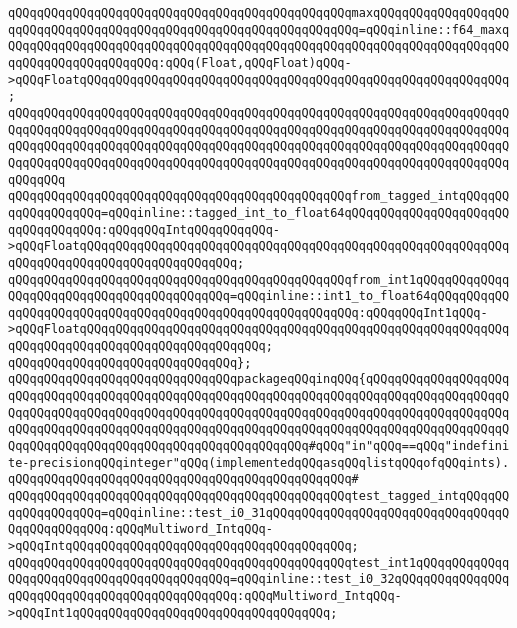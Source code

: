 \verb|qQQqqQQqqQQqqQQqqQQqqQQqqQQqqQQqqQQqqQQqqQQqqQQqmaxqQQqqQQqqQQqqQQqqQQqqQQqqQQqqQQqqQQqqQQqqQQqqQQqqQQqqQQqqQQqqQQqqQQq=qQQqinline::f64_maxqQQqqQQqqQQqqQQqqQQqqQQqqQQqqQQqqQQqqQQqqQQqqQQqqQQqqQQqqQQqqQQqqQQqqQQqqQQqqQQqqQQqqQQqqQQq:qQQq(Float,qQQqFloat)qQQq->qQQqFloatqQQqqQQqqQQqqQQqqQQqqQQqqQQqqQQqqQQqqQQqqQQqqQQqqQQqqQQqqQQq;|\newline
\verb|qQQqqQQqqQQqqQQqqQQqqQQqqQQqqQQqqQQqqQQqqQQqqQQqqQQqqQQqqQQqqQQqqQQqqQQqqQQqqQQqqQQqqQQqqQQqqQQqqQQqqQQqqQQqqQQqqQQqqQQqqQQqqQQqqQQqqQQqqQQqqQQqqQQqqQQqqQQqqQQqqQQqqQQqqQQqqQQqqQQqqQQqqQQqqQQqqQQqqQQqqQQqqQQqqQQqqQQqqQQqqQQqqQQqqQQqqQQqqQQqqQQqqQQqqQQqqQQqqQQqqQQqqQQqqQQqqQQqqQQqqQQqqQQq|\newline
\verb|qQQqqQQqqQQqqQQqqQQqqQQqqQQqqQQqqQQqqQQqqQQqqQQqfrom_tagged_intqQQqqQQqqQQqqQQqqQQq=qQQqinline::tagged_int_to_float64qQQqqQQqqQQqqQQqqQQqqQQqqQQqqQQqqQQq:qQQqqQQqIntqQQqqQQqqQQq->qQQqFloatqQQqqQQqqQQqqQQqqQQqqQQqqQQqqQQqqQQqqQQqqQQqqQQqqQQqqQQqqQQqqQQqqQQqqQQqqQQqqQQqqQQqqQQqqQQq;|\newline
\verb|qQQqqQQqqQQqqQQqqQQqqQQqqQQqqQQqqQQqqQQqqQQqqQQqfrom_int1qQQqqQQqqQQqqQQqqQQqqQQqqQQqqQQqqQQqqQQqqQQq=qQQqinline::int1_to_float64qQQqqQQqqQQqqQQqqQQqqQQqqQQqqQQqqQQqqQQqqQQqqQQqqQQqqQQqqQQq:qQQqqQQqInt1qQQq->qQQqFloatqQQqqQQqqQQqqQQqqQQqqQQqqQQqqQQqqQQqqQQqqQQqqQQqqQQqqQQqqQQqqQQqqQQqqQQqqQQqqQQqqQQqqQQqqQQqqQQq;|\newline
\verb|qQQqqQQqqQQqqQQqqQQqqQQqqQQqqQQq};|\newline
\newline
\verb|qQQqqQQqqQQqqQQqqQQqqQQqqQQqqQQqpackageqQQqinqQQq{qQQqqQQqqQQqqQQqqQQqqQQqqQQqqQQqqQQqqQQqqQQqqQQqqQQqqQQqqQQqqQQqqQQqqQQqqQQqqQQqqQQqqQQqqQQqqQQqqQQqqQQqqQQqqQQqqQQqqQQqqQQqqQQqqQQqqQQqqQQqqQQqqQQqqQQqqQQqqQQqqQQqqQQqqQQqqQQqqQQqqQQqqQQqqQQqqQQqqQQqqQQqqQQqqQQqqQQqqQQqqQQqqQQqqQQqqQQqqQQqqQQqqQQqqQQqqQQqqQQqqQQqqQQqqQQq#qQQq"in"qQQq==qQQq"indefinite-precisionqQQqinteger"qQQq(implementedqQQqasqQQqlistqQQqofqQQqints).|\newline
\verb|qQQqqQQqqQQqqQQqqQQqqQQqqQQqqQQqqQQqqQQqqQQqqQQq#|\newline
\verb|qQQqqQQqqQQqqQQqqQQqqQQqqQQqqQQqqQQqqQQqqQQqqQQqtest_tagged_intqQQqqQQqqQQqqQQqqQQq=qQQqinline::test_i0_31qQQqqQQqqQQqqQQqqQQqqQQqqQQqqQQqqQQqqQQqqQQqqQQq:qQQqMultiword_IntqQQq->qQQqIntqQQqqQQqqQQqqQQqqQQqqQQqqQQqqQQqqQQqqQQq;|\newline
\verb|qQQqqQQqqQQqqQQqqQQqqQQqqQQqqQQqqQQqqQQqqQQqqQQqtest_int1qQQqqQQqqQQqqQQqqQQqqQQqqQQqqQQqqQQqqQQqqQQq=qQQqinline::test_i0_32qQQqqQQqqQQqqQQqqQQqqQQqqQQqqQQqqQQqqQQqqQQqqQQq:qQQqMultiword_IntqQQq->qQQqInt1qQQqqQQqqQQqqQQqqQQqqQQqqQQqqQQqqQQq;|\newline
